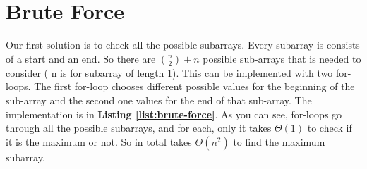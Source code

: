 \section{Brute Force}
Our first solution is to check all the possible 
subarrays. Every subarray is consists of a start 
and an end. So there are $\binom{n}{2} + n $
possible sub-arrays that is needed to consider
( n is for subarray of length 1). 
This can be implemented with two for-loops. The 
first for-loop chooses different possible 
values for the beginning of the sub-array 
and the second one values for the end of 
that sub-array. The implementation is in 
\textbf{Listing \ref{list:brute-force}}.
As you can see, for-loops go through all the possible 
subarrays, and for each, only it takes $\Theta(1)$ 
to check if it is the maximum or not. So in total 
takes $\Theta(n^2)$ to find the maximum subarray.
